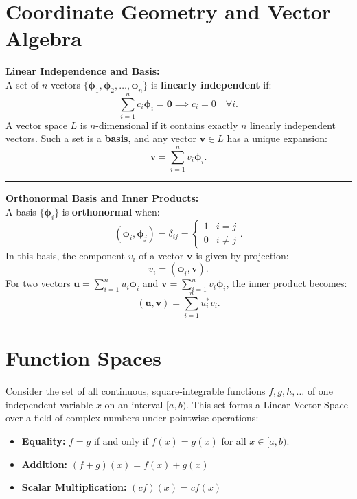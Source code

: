 \documentclass[11pt, a4paper]{report}
\begin{document}
\section{Coordinate Geometry and Vector Algebra}

\textbf{Linear Independence and Basis:} \\
A set of $n$ vectors $\{\boldsymbol{\phi}_1, \boldsymbol{\phi}_2, \dots, \boldsymbol{\phi}_n\}$ is \textbf{linearly independent} if:
\[ \sum_{i=1}^n c_i \boldsymbol{\phi}_i = \mathbf{0} \implies c_i = 0 \quad \forall i. \]
A vector space $L$ is $n$-dimensional if it contains exactly $n$ linearly independent vectors. Such a set is a \textbf{basis}, and any vector $\mathbf{v} \in L$ has a unique expansion:
\[ \mathbf{v} = \sum_{i=1}^n v_i \boldsymbol{\phi}_i. \]


\vspace{0.3cm}

\vspace{1em}
\hrule
\vspace{1em}

\textbf{Orthonormal Basis and Inner Products:} \\
A basis $\{\boldsymbol{\phi}_i\}$ is \textbf{orthonormal} when:
\[ (\boldsymbol{\phi}_i, \boldsymbol{\phi}_j) = \delta_{ij} = \begin{cases} 1 & i = j \\ 0 & i \neq j \end{cases}. \]
In this basis, the component $v_i$ of a vector $\mathbf{v}$ is given by projection:
\[ v_i = (\boldsymbol{\phi}_i, \mathbf{v}). \]
For two vectors $\mathbf{u} = \sum_{i=1}^n u_i \boldsymbol{\phi}_i$ and $\mathbf{v} = \sum_{i=1}^n v_i \boldsymbol{\phi}_i$, the inner product becomes:
\[ (\mathbf{u}, \mathbf{v}) = \sum_{i=1}^n u_i^* v_i. \]


\section{Function Spaces}

Consider the set of all continuous, square-integrable functions $f, g, h, \dots$ of one independent variable $x$ on an interval $[a, b)$. This set forms a Linear Vector Space over a field of complex numbers under pointwise operations:
\begin{itemize}
    \item \textbf{Equality:} $f = g$ if and only if $f(x) = g(x)$ for all $x \in [a, b)$.
    \item \textbf{Addition:} $(f+g)(x) = f(x) + g(x)$
    \item \textbf{Scalar Multiplication:} $(cf)(x) = c f(x)$
\end{itemize}
\end{document}
